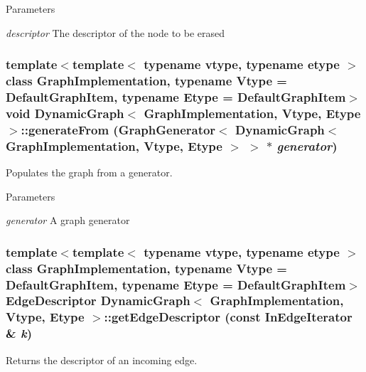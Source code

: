 \begin{DoxyParams}{Parameters}
\item[{\em descriptor}]The descriptor of the node to be erased \end{DoxyParams}
\hypertarget{class_dynamic_graph_ae71e8643f129b0ffffe5cc8e6878fd2f}{
\subsubsection[{generateFrom}]{\setlength{\rightskip}{0pt plus 5cm}template$<$template$<$ typename vtype, typename etype $>$ class GraphImplementation, typename Vtype  = DefaultGraphItem, typename Etype  = DefaultGraphItem$>$ void {\bf DynamicGraph}$<$ GraphImplementation, Vtype, Etype $>$::generateFrom (GraphGenerator$<$ {\bf DynamicGraph}$<$ GraphImplementation, Vtype, Etype $>$ $>$ $\ast$ {\em generator})}}
\label{class_dynamic_graph_ae71e8643f129b0ffffe5cc8e6878fd2f}


Populates the graph from a generator. 


\begin{DoxyParams}{Parameters}
\item[{\em generator}]A graph generator \end{DoxyParams}
\hypertarget{class_dynamic_graph_ab0eb6d1bc17887c04540e47411430751}{
\subsubsection[{getEdgeDescriptor}]{\setlength{\rightskip}{0pt plus 5cm}template$<$template$<$ typename vtype, typename etype $>$ class GraphImplementation, typename Vtype  = DefaultGraphItem, typename Etype  = DefaultGraphItem$>$ EdgeDescriptor {\bf DynamicGraph}$<$ GraphImplementation, Vtype, Etype $>$::getEdgeDescriptor (const InEdgeIterator \& {\em k})}}
\label{class_dynamic_graph_ab0eb6d1bc17887c04540e47411430751}


Returns the descriptor of an incoming edge. 


